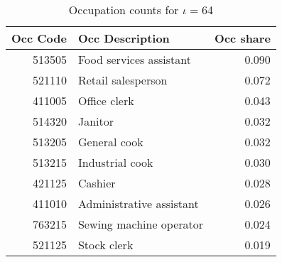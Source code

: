 \begin{table}
\centering
\caption{Occupation counts for $\iota=$64}
\label{table:shock_case_study_AccomFood_most_shocked_iota_occ_counts_3}
\begin{tabular}{rlr}
\toprule
Occ Code &          Occ Description & Occ share \\
\midrule
  513505 &  Food services assistant &     0.090 \\
  521110 &       Retail salesperson &     0.072 \\
  411005 &             Office clerk &     0.043 \\
  514320 &                  Janitor &     0.032 \\
  513205 &             General cook &     0.032 \\
  513215 &          Industrial cook &     0.030 \\
  421125 &                  Cashier &     0.028 \\
  411010 & Administrative assistant &     0.026 \\
  763215 &  Sewing machine operator &     0.024 \\
  521125 &              Stock clerk &     0.019 \\
\bottomrule
\end{tabular}
\end{table}

